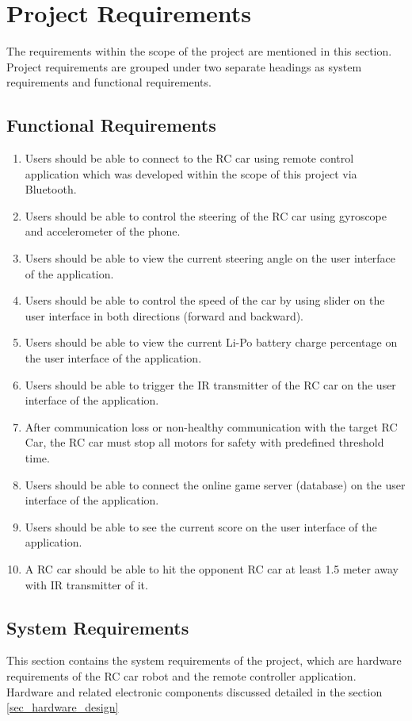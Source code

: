 \section{Project Requirements}
The requirements within the scope of the project are mentioned in this section. Project requirements are grouped under two separate headings as system requirements and functional requirements.

\subsection{Functional Requirements}
\begin{enumerate}
    \item Users should be able to connect to the RC car using remote control application which was developed within the scope of this project via Bluetooth\texttrademark.
    \item Users should be able to control the steering of the RC car using gyroscope and accelerometer of the phone.
    \item Users should be able to view the current steering angle on the user interface of the application.
    \item Users should be able to control the speed of the car by using slider on the user interface in both directions (forward and backward).
    \item Users should be able to view the current Li-Po battery charge percentage on the user interface of the application.
    \item Users should be able to trigger the IR transmitter of the RC car on the user interface of the application.
    \item After communication loss or non-healthy communication with the target RC Car, the RC car must stop all motors for safety with predefined threshold time.
    \item Users should be able to connect the online game server (database) on the user interface of the application.
    \item Users should be able to see the current score on the user interface of the application.
    \item A RC car should be able to hit the opponent RC car at least 1.5 meter away with IR transmitter of it.
\end{enumerate}

\subsection{System Requirements}
This section contains the system requirements of the project, which are hardware requirements of the RC car robot and the remote controller application. Hardware and related electronic components discussed detailed in the section \ref{sec_hardware_design}\\

